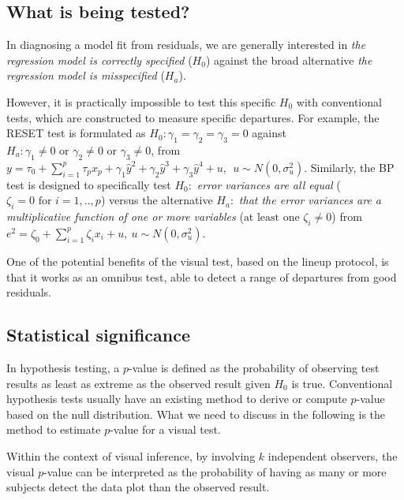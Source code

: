 \documentclass[]{interact}
\theoremstyle{plain}%
\theoremstyle{definition}
\theoremstyle{remark}
\begin{document}
\hypertarget{what-is-being-tested}{%
\subsection{What is being tested?}\label{what-is-being-tested}}

In diagnosing a model fit from residuals, we are generally interested in
\emph{the regression model is correctly specified} (\(H_0\)) against the
broad alternative \emph{the regression model is misspecified} (\(H_a\)).

However, it is practically impossible to test this specific \(H_0\) with
conventional tests, which are constructed to measure specific
departures. For example, the RESET test is formulated as
\(H_0:\gamma_1 = \gamma_2 = \gamma_3 = 0\) against
\(H_a: \gamma_1 \neq 0 \text{ or } \gamma_2 \neq 0 \text{ or } \gamma_3 \neq 0\),
from
\(y = \tau_0 + \sum_{i=1}^{p}\tau_px_p +\gamma_1\hat{y}^2 + \gamma_2\hat{y}^3 + \gamma_3\hat{y}^4 + u, ~~u \sim N(0, \sigma_u^2)\).
Similarly, the BP test is designed to specifically test \(H_0:\)
\emph{error variances are all equal}
(\(\zeta_i=0 \text{ for } i=1,..,p\)) versus the alternative \(H_a:\)
\emph{that the error variances are a multiplicative function of one or
more variables} (\(\text{at least one } \zeta_i\neq 0\)) from
\(e^2 = \zeta_0 + \sum_{i=1}^{p}\zeta_i x_i + u, ~ u\sim N(0,\sigma_u^2)\).

One of the potential benefits of the visual test, based on the lineup
protocol, is that it works as an omnibus test, able to detect a range of
departures from good residuals.

\hypertarget{statistical-significance}{%
\subsection{\texorpdfstring{Statistical
significance\label{sig}}{Statistical significance}}\label{statistical-significance}}

In hypothesis testing, a \(p\)-value is defined as the probability of
observing test results as least as extreme as the observed result given
\(H_0\) is true. Conventional hypothesis tests usually have an existing
method to derive or compute \(p\)-value based on the null distribution.
What we need to discuss in the following is the method to estimate
\(p\)-value for a visual test.

Within the context of visual inference, by involving \(k\) independent
observers, the visual \(p\)-value can be interpreted as the probability
of having as many or more subjects detect the data plot than the
observed result.
\end{document}
